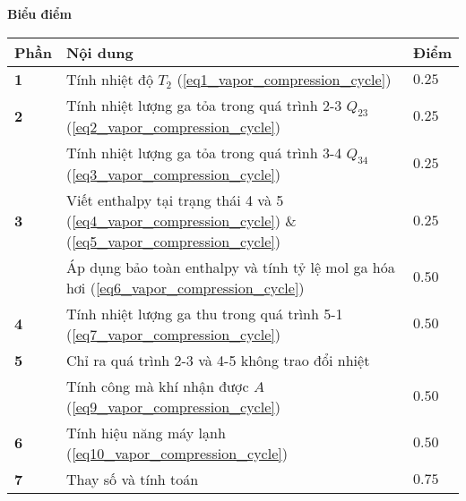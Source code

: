 \textbf{Biểu điểm}
\begin{center}
\begin{tabular}{|>{\centering\arraybackslash}m{1cm}|>{\raggedright\arraybackslash}m{14cm}| >{\centering\arraybackslash}m{1cm}|}
    \hline
    \textbf{Phần} & \textbf{Nội dung} & \textbf{Điểm} \\
    \hline
    \textbf{1} & Tính nhiệt độ $T_2$ (\ref{eq1_vapor_compression_cycle}) & $0.25$ \\
    \hline
    \textbf{2} & Tính nhiệt lượng ga tỏa trong quá trình 2-3 $Q_{23}$ (\ref{eq2_vapor_compression_cycle}) & $0.25$ \\
    \cline{2-3}
    & Tính nhiệt lượng ga tỏa trong quá trình 3-4 $Q_{34}$ (\ref{eq3_vapor_compression_cycle}) & $0.25$ \\
    \hline
    \textbf{3} & Viết enthalpy tại trạng thái 4 và 5 (\ref{eq4_vapor_compression_cycle}) \& (\ref{eq5_vapor_compression_cycle}) & $0.25$ \\
    \cline{2-3}
    & Áp dụng bảo toàn enthalpy và tính tỷ lệ mol ga hóa hơi (\ref{eq6_vapor_compression_cycle}) & $0.50$ \\
    \hline
    \textbf{4} & Tính nhiệt lượng ga thu trong quá trình 5-1 (\ref{eq7_vapor_compression_cycle}) & $0.50$ \\
    \hline
    \textbf{5} & Chỉ ra quá trình 2-3 và 4-5 không trao đổi nhiệt & 0.25 \\
    \cline{2-3}
    & Tính công mà khí nhận được $A$ (\ref{eq9_vapor_compression_cycle}) & $0.50$ \\
    \hline
    \textbf{6} & Tính hiệu năng máy lạnh (\ref{eq10_vapor_compression_cycle}) & $0.50$ \\
    \hline
    \textbf{7} & Thay số và tính toán & $0.75$ \\
    \hline
\end{tabular}
\end{center}
